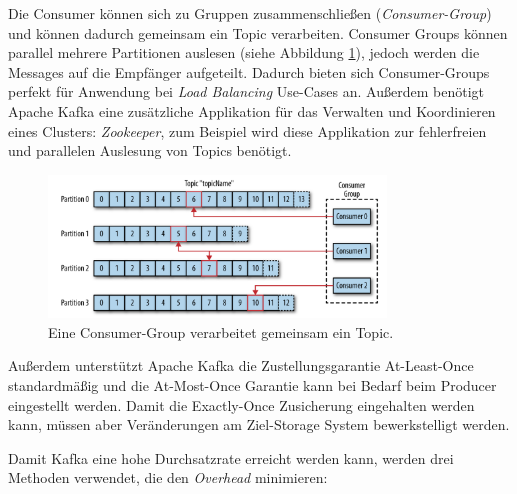 Die Consumer können sich zu Gruppen zusammenschließen (\emph{Consumer-Group}) und können dadurch gemeinsam ein Topic verarbeiten. Consumer Groups können parallel mehrere Partitionen auslesen (siehe Abbildung \ref{fig:partitionsKafkaDefinitiveGuide}), jedoch werden die Messages auf die Empfänger aufgeteilt. Dadurch bieten sich Consumer-Groups perfekt für Anwendung bei \emph{Load Balancing} Use-Cases an. Außerdem benötigt Apache Kafka eine zusätzliche Applikation für das Verwalten und Koordinieren eines Clusters: \emph{Zookeeper}, zum Beispiel wird diese Applikation zur fehlerfreien und parallelen Auslesung von Topics benötigt.  \cite{narkhedeKafkaDefinitiveGuide2017}

\begin{figure}
    \centering
    \includegraphics[width=0.8\textwidth]{content/img/Research/Message_Services/partitionsKafkaDefinitiveGuide.png}
    \caption{Eine Consumer-Group verarbeitet gemeinsam ein Topic. \cite{narkhedeKafkaDefinitiveGuide2017}}
    \label{fig:partitionsKafkaDefinitiveGuide}
\end{figure}
\FloatBarrier

Außerdem unterstützt Apache Kafka die Zustellungsgarantie At-Least-Once standardmäßig und die At-Most-Once Garantie kann bei Bedarf beim Producer eingestellt werden. Damit die Exactly-Once Zusicherung eingehalten werden kann, müssen aber Veränderungen am Ziel-Storage System bewerkstelligt werden. \cite{narkhedeKafkaDefinitiveGuide2017}

\newpage

Damit Kafka eine hohe Durchsatzrate erreicht werden kann, werden drei Methoden verwendet, die den \emph{Overhead} minimieren: \cite{narkhedeKafkaDefinitiveGuide2017}

